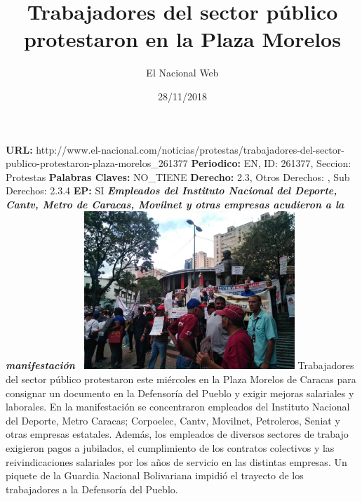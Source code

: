\documentclass{article}%
\title{\textbf{Trabajadores del sector público protestaron en la Plaza Morelos}}%
\author{El Nacional Web}%
\date{28/11/2018}%
\begin{document}
%
\normalsize%
\maketitle%
\textbf{URL: }%
http://www.el{-}nacional.com/noticias/protestas/trabajadores{-}del{-}sector{-}publico{-}protestaron{-}plaza{-}morelos\_261377\newline%
%
\textbf{Periodico: }%
EN, %
ID: %
261377, %
Seccion: %
Protestas\newline%
%
\textbf{Palabras Claves: }%
NO\_TIENE\newline%
%
\textbf{Derecho: }%
2.3, %
Otros Derechos: %
, %
Sub Derechos: %
2.3.4\newline%
%
\textbf{EP: }%
SI\newline%
\newline%
%
\textbf{\textit{Empleados del Instituto Nacional del Deporte, Cantv, Metro de Caracas, Movilnet y otras empresas acudieron a la manifestación~}}%
\newline%
\newline%
%
\includegraphics[width=300px]{194.jpg}%
\newline%
%
Trabajadores del sector público protestaron este miércoles en la Plaza Morelos de Caracas para consignar un documento en la Defensoría del Pueblo y exigir mejoras salariales y laborales.%
\newline%
%
En la manifestación se concentraron empleados del Instituto Nacional del Deporte, Metro Caracas; Corpoelec, Cantv, Movilnet, Petroleros, Seniat y otras empresas estatales.%
\newline%
%
Además, los empleados de diversos sectores de trabajo exigieron pagos a jubilados, el cumplimiento de los contratos colectivos y las reivindicaciones salariales por los años de servicio en las distintas empresas.%
\newline%
%
Un piquete de la Guardia Nacional Bolivariana impidió el trayecto de los trabajadores a la Defensoría del Pueblo.%
\newline%
%
\end{document}
